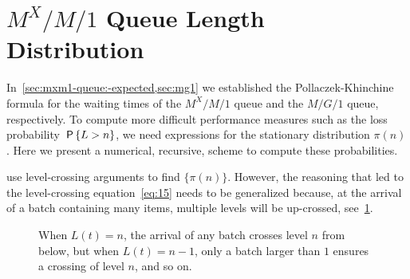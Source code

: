 


\section{$M^X/M/1$ Queue Length Distribution}\label{sec:batch-arrivals}


In~\cref{sec:mxm1-queue:-expected,sec:mg1} we established the Pollaczek-Khinchine formula for the waiting times of the $M^X/M/1$ queue and the $M/G/1$ queue, respectively.
To compute more difficult performance measures such as the loss probability $\,\mathsf{P}\left\{L>n\right\}$, we need expressions for the stationary distribution $\pi(n)$.
Here we present a numerical, recursive, scheme to compute these probabilities.


 use level-crossing arguments to find $\{\pi(n)\}$.
However, the reasoning that led to the level-crossing equation~\cref{eq:15} needs to be generalized because, at the arrival of a batch containing many items, multiple levels will be up-crossed, see~\cref{fig:levelcrossing}.


\begin{figure}[ht]
\centering
{}

\caption{When $L(t)=n$, the arrival of any batch crosses level $n$ from below, but when $L(t)=n-1$, only a batch larger than $1$ ensures a crossing of level $n$, and so on.} \label{fig:levelcrossing}
\end{figure}


